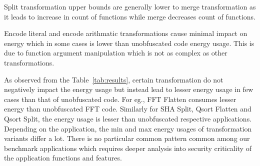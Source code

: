 Split transformation upper bounds are generally lower to merge transformation as it leads to increase in count of functions while merge decreases count of functions.

Encode literal and encode arithmatic transformations cause minimal impact on energy which in some cases is lower than unobfuscated code energy usage. This is due to function argument manipulation which is not as complex as other transformations.


As observed from the Table~\ref{tab:results}, certain transformation do not negatively impact the energy usage but instead lead to lesser energy usage in few cases than that of unobfuscated code. For eg., FFT Flatten consumes lesser energy than unobfuscated FFT code. Similarly for SHA Split, Qsort Flatten and Qsort Split, the energy usage is lesser than unobfuscated respective applications.
Depending on the application, the min and max energy usages of transformation variants differ a lot. There is no particular  common pattern common among our benchmark applications which requires deeper analysis into security criticality of the application functions and features.




\endinput
The immediate impact of the obfuscation transformation seems highest for virtualize in terms of energy usage due to higher execution times and higher power drawn during execution.

It reaches as far as 1.02 to 83.26 times of increase in average energy usage to that of unobfuscated code for CRC32. 
It reaches as far as 0.70 to 47.83 times of increase in average energy usage to that of unobfuscated code for FFT.
It reaches as far as 0.74 to 2239.39 times of increase in average energy usage to that of unobfuscated code for SHA.
It reaches as far as 0.64 to 2.48 times of increase in average energy usage to that of unobfuscated code for Patricia.
It reaches as far as 0.68 to 17.12 times of increase in average energy usage to that of unobfuscated code for Qsort.





